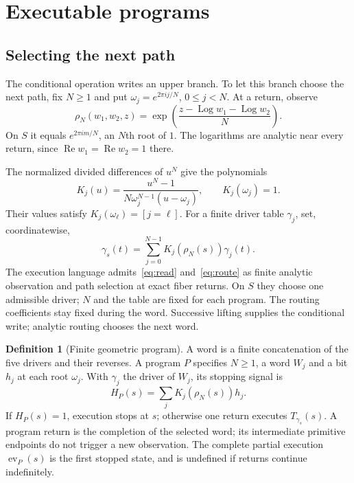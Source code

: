 \documentclass[11pt]{article}
\theoremstyle{definition}
\newtheorem{definition}{Definition}[section]
\theoremstyle{plain}
\newcommand{\Log}{\operatorname{Log}}
\newcommand{\ev}{\operatorname{ev}}
\begin{document}
\section{Executable programs}\label{sec:programs}

\subsection*{Selecting the next path}
The conditional operation writes an upper branch. To let this branch
choose the next path, fix $N\ge1$ and put
$\omega_j=e^{2\pi ij/N}$, $0\le j<N$. At a return, observe
\begin{equation}\label{eq:read}
 \rho_N(w_1,w_2,z)=
 \exp\left(\frac{z-\Log w_1-\Log w_2}{N}\right).
\end{equation}
On $S$ it equals $e^{2\pi im/N}$, an $N$th root of $1$.
The logarithms are analytic near every return, since
$\operatorname{Re}w_1=\operatorname{Re}w_2=1$ there.

The normalized divided differences of $u^N$ give the polynomials
\[
 K_j(u)=\frac{u^N-1}{N\omega_j^{N-1}(u-\omega_j)},
 \qquad K_j(\omega_j)=1.
\]
Their values satisfy $K_j(\omega_\ell)=[j=\ell]$.
For a finite driver table $\gamma_j$, set, coordinatewise,
\begin{equation}\label{eq:route}
 \gamma_s(t)=\sum_{j=0}^{N-1}K_j(\rho_N(s))\gamma_j(t).
\end{equation}
The execution language admits~\eqref{eq:read} and~\eqref{eq:route} as
finite analytic observation and path selection at exact fiber returns.
On $S$ they choose one admissible driver; $N$ and the table are fixed
for each program. The routing coefficients stay fixed during the word.
Successive lifting supplies the conditional write; analytic routing
chooses the next word.

\begin{definition}[Finite geometric program]\label{def:program}
A word is a finite concatenation of the five drivers and their
reverses. A program $P$ specifies $N\ge1$, a word $W_j$ and a bit
$h_j$ at each root $\omega_j$. With $\gamma_j$ the driver of $W_j$,
its stopping signal is
\[
 H_P(s)=\sum_jK_j(\rho_N(s))h_j.
\]
If $H_P(s)=1$, execution stops at $s$; otherwise one return executes
$T_{\gamma_s}(s)$. A program return is the completion of the selected
word; its intermediate primitive endpoints do not trigger a new
observation. The complete partial execution $\ev_P(s)$ is the
first stopped state, and is undefined if returns continue indefinitely.
\end{definition}
\end{document}
